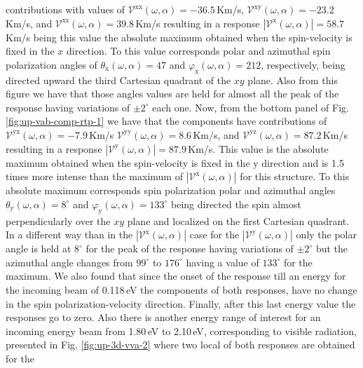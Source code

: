 \documentclass[prb,11pt,tightenlines,twocolumn,aps]{revtex4-1}
\begin{document}
contributions with values of
% 
$\mathcal{V}^{\mathrm{xx}}(\omega,\alpha)=-36.5$\,Km/s,
$\mathcal{V}^{\mathrm{xy}}(\omega,\alpha)=-23.2$\,Km/s, and
$\mathcal{V}^{\mathrm{xz}}(\omega,\alpha)= 39.8$\,Km/s resulting in a response
$|\mathcal{V}^{\mathrm{x}}(\omega,\alpha)|=58.7$\,Km/s being this value the
absolute maximum obtained when the spin-velocity is fixed in the $x$ direction.
% 
{\color{red} To this value corresponds polar and azimuthal spin polarization
angles of $\theta_{\mathrm{x}}(\omega,\alpha)=47$ and
$\varphi_{\mathrm{x}}(\omega,\alpha)=212$, respectively, being directed upward
the third Cartesian quadrant of the $xy$ plane.
% 
Also from this figure we have that those angles values are held for almost all
the peak of the response having variations of $\pm 2^{\circ}$ each one.
% 
Now, from the bottom panel of Fig. \ref{fig:up-vab-comp-rtp-1} we have that the
components have contributions of
% 
$\mathcal{V}^{\mathrm{yx}}(\omega,\alpha)= -7.9$\,Km/s 
$\mathcal{V}^{\mathrm{yy}}(\omega,\alpha)=  8.6$\,Km/s, and
$\mathcal{V}^{\mathrm{yz}}(\omega,\alpha)= 87.2$\,Km/s 
% 
resulting in a response $|\mathcal{V}^{\mathrm{y}}(\omega,\alpha)|=87.9$\,Km/s.
This value is the absolute maximum obtained when the spin-velocity is fixed in
the $\mathrm{y}$ direction and is 1.5 times more intense than the maximum of
$|\mathcal{V}^{\mathrm{x}}(\omega,\alpha)|$ for this structure. To this
absolute maximum corresponds spin polarization polar and azimuthal angles
$\theta_{\mathrm{y}}(\omega,\alpha) = 8^{\circ}$ and
$\varphi_{\mathrm{y}}(\omega,\alpha) = 133^{\circ}$ being directed the spin
almost perpendicularly over the $xy$ plane and  localized on the first
Cartesian quadrant.}
% 
In a different way than in the $|\mathcal{V}^{\mathrm{x}}(\omega,\alpha)|$ case
for the $|\mathcal{V}^{\mathrm{y}}(\omega,\alpha)|$ only the polar angle is
held at $8^{\circ}$ for the peak of the response having variations of $\pm
2^{\circ}$ but the azimuthal angle changes from $99^{\circ}$ to $176^{\circ}$
having a value of $133^{\circ}$ for the maximum.
% 
We also found that since the onset of the response till an energy for the
incoming beam of 0.118\,eV the components of both responses, have no change in
the spin polarization-velocity direction. Finally, after this last energy value
the responses go to zero.
Also there is another energy range of interest for an incoming energy beam from
1.80\,eV to 2.10\,eV, corresponding to visible radiation, presented in Fig.
\ref{fig:up-3d-vva-2} where two local of both responses are obtained for the
\end{document}
